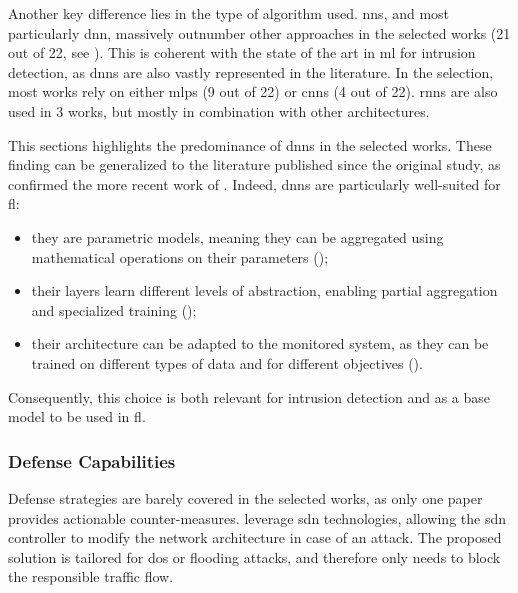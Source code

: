 Another key difference lies in the type of algorithm used.
\Glspl{nn}, and most particularly \gls{dnn}, massively outnumber other approaches in the selected works (21 out of 22, see ).
This is coherent with the state of the art in \gls{ml} for intrusion detection, as \glspl{dnn} are also vastly represented in the literature.
In the selection, most works rely on either \glspl{mlp} (9 out of 22) or \glspl{cnn} (4 out of 22).
\Glspl{rnn} are also used in 3 works, but mostly in combination with other architectures. 


This sections highlights the predominance of \glspl{dnn} in the selected works.
These finding can be generalized to the literature published since the original study, as confirmed the more recent work of \textcite{ismaila_ReviewApproachesFederated_2024}.
Indeed, \glspl{dnn} are particularly well-suited for \gls{fl}:
\begin{itemize}
  \item they are parametric models, meaning they can be aggregated using mathematical operations on their parameters ();
  \item their layers learn different levels of abstraction, enabling partial aggregation and specialized training ();
  \item their architecture can be adapted to the monitored system, as they can be trained on different types of data and for different objectives ().
\end{itemize}
Consequently, this choice is both relevant for intrusion detection and as a base model to be used in \gls{fl}.


\begin{table}[]
  \centering
  \caption{
    Comparative overview of selected works in the original study---algorithms and performance (2/2).%
    \label{tbl:sota.perf}%
  }%
  \resizebox{\textwidth}{!}{}
\end{table}


\subsubsection{Defense Capabilities\label{sec:sota.quali.defense}}

Defense strategies are barely covered in the selected works, as only one paper provides actionable counter-measures.
\textcite{rathore_BlockSecIoTNetBlockchainbaseddecentralized_2019} leverage \gls{sdn} technologies, allowing the \gls{sdn} controller to modify the network architecture in case of an attack.
The proposed solution is tailored for \gls{dos} or flooding attacks, and therefore only needs to block the responsible traffic flow.

